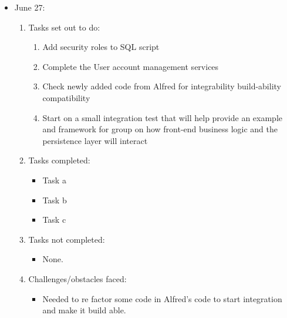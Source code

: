 \documentclass[12pt]{article}
\begin{document}
	\begin{itemize}
		\item June 27:
		\begin{enumerate}
			\item Tasks set out to do:
			\begin{enumerate}
				\item Add security roles to SQL script
				\item Complete the User account management services
				\item Check newly added code from Alfred for integrability build-ability compatibility
				\item Start on a small integration test that will help provide an example and framework for group on how front-end business logic and the persistence layer will interact				
			\end{enumerate}
			\item Tasks completed:
			\begin{itemize}
				\item Task a
				\item Task b
				\item Task c				
			\end{itemize}
			\item Tasks not completed:
			\begin{itemize}
				\item None.
			\end{itemize}
			\item Challenges/obstacles faced:
			\begin{itemize}
				\item Needed to re factor some code in Alfred's code to start integration and make it build able.
			\end{itemize}			
		\end{enumerate}
	\end{itemize}
\end{document}
